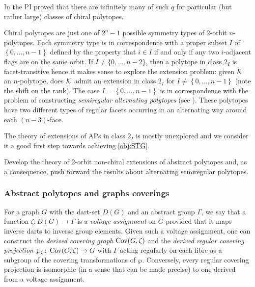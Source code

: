 In \cite{Montero2021_SchlaefliSymbolChiral} the PI proved that there are infinitely many of such $q$ for particular (but rather large) classes of chiral polytopes.

Chiral polytopes are just one of  $2^{n}-1$ possible symmetry types of $2$-orbit $n$-polytopes.
Each symmetry type is in correspondence with a proper subset $I$ of $\left\{ 0, \dots, n-1 \right\} $ defined by the property that $i \in I$ if and only if any two $i$-adjacent flags are on the same orbit.
If $I \neq \{0, \dots, n-2\}$, then a polytope in class $2_{I} $ is facet-transitive hence it makes sense to explore the extension problem: given $\mathcal{K}$ an $n$-polytope, does $\mathcal{K}$ admit an extension in class $2_{I}$ for $I \neq \left\{ 0, \dots, n-1 \right\} $ (note the shift on the rank).
The case $I=\left\{ 0, \dots, n-1 \right\} $ is in correspondence with the problem of constructing \emph{semiregular alternating polytopes} (see \cite{MonsoSchul2022_InterlacingNumberAlternating,MonsoSchul2020_UniversalAlternatingSemiregular,MonsoSchul2019_AssemblyProblemAlternating,MonsoSchul2012_SemiregularPolytopesAmalgamated}).
These polytopes have two different types of regular facets occurring in an alternating way around each $(n-3)$-face.

The theory of extensions of APs in class $2_I$ is mostly unexplored and we consider it a good first step towards achieving \cref{obj:STG}.

\begin{obj}\label{obj:2_I}
  Develop the theory of $2$-orbit non-chiral extensions of abstract polytopes and, as a consequence, push forward the results about alternating semiregular polytopes.
\end{obj}

\subsubsection*{Abstract polytopes and graphs coverings}

For a graph $G$ with the dart-set $D(G)$ and an abstract group $\Gamma$, we say that a function $\zeta :  D(G) \to \Gamma$ is  a \emph{voltage assignment}  on $G$ provided that it maps inverse darts to inverse group elements. 
Given such
 a voltage assignment, one can construct the \emph{derived covering graph} $\operatorname{Cov}(G,\zeta)$ and the \emph{derived regular covering projection}
 $\wp_\zeta \colon \operatorname{Cov}(G,\zeta) \to G$
 with $\Gamma$ acting regularly on each fibre as a subgroup of the covering transformations of $\wp$.
Conversely, every regular covering projection is isomorphic (in a sense that can be made precise) to one derived from a voltage assignment.

